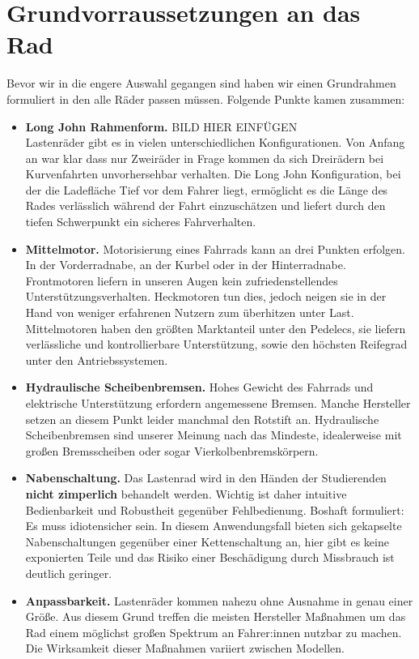 \documentclass[a4paper,ngerman, 14pt] {scrartcl}
\begin{document}
\section{Grundvorraussetzungen an das Rad}
Bevor wir in die engere Auswahl gegangen sind haben wir einen Grundrahmen formuliert in den alle Räder passen müssen. Folgende Punkte kamen zusammen:\\
\begin{itemize}
    \item \textbf{Long John Rahmenform.} BILD HIER EINFÜGEN\\ Lastenräder gibt es in vielen unterschiedlichen Konfigurationen. Von Anfang an war klar dass nur Zweiräder in Frage kommen da sich Dreirädern bei Kurvenfahrten unvorhersehbar verhalten. Die Long John Konfiguration, bei der die Ladefläche Tief vor dem Fahrer liegt, ermöglicht es die Länge des Rades verlässlich während der Fahrt einzuschätzen und liefert durch den tiefen Schwerpunkt ein sicheres Fahrverhalten.
    \item \textbf{Mittelmotor.} Motorisierung eines Fahrrads kann an drei Punkten erfolgen. In der Vorderradnabe, an der Kurbel oder in der Hinterradnabe. Frontmotoren liefern in unseren Augen kein zufriedenstellendes Unterstützungsverhalten. Heckmotoren tun dies, jedoch neigen sie in der Hand von weniger erfahrenen Nutzern zum überhitzen unter Last. Mittelmotoren haben den größten Marktanteil unter den Pedelecs, sie liefern verlässliche und kontrollierbare Unterstützung, sowie den höchsten Reifegrad unter den Antriebssystemen.
    \item \textbf{Hydraulische Scheibenbremsen.} Hohes Gewicht des Fahrrads und elektrische Unterstützung erfordern angemessene Bremsen. Manche Hersteller setzen an diesem Punkt leider manchmal den Rotstift an. Hydraulische Scheibenbremsen sind unserer Meinung nach das Mindeste, idealerweise mit großen Bremsscheiben oder sogar Vierkolbenbremskörpern.
    \item \textbf{Nabenschaltung.} Das Lastenrad wird in den Händen der Studierenden \textbf{nicht zimperlich} behandelt werden. Wichtig ist daher intuitive Bedienbarkeit und Robustheit gegenüber Fehlbedienung. Boshaft formuliert: Es muss idiotensicher sein. In diesem Anwendungsfall bieten sich gekapselte Nabenschaltungen gegenüber einer Kettenschaltung an, hier gibt es keine exponierten Teile und das Risiko einer Beschädigung durch Missbrauch ist deutlich geringer.
    \item \textbf{Anpassbarkeit.} Lastenräder kommen nahezu ohne Ausnahme in genau einer Größe. Aus diesem Grund treffen die meisten Hersteller Maßnahmen um das Rad einem möglichst großen Spektrum an Fahrer:innen nutzbar zu machen. Die Wirksamkeit dieser Maßnahmen variiert zwischen Modellen.
\end{itemize}
\end{document}

